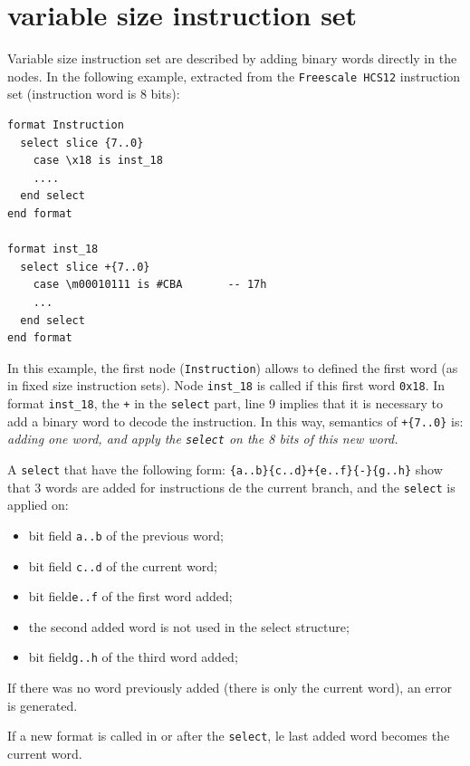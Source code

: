
\section{variable size instruction set}
\label{sec:formatTailleVariable}
Variable size instruction set are described by adding binary words directly in the nodes.
In the following example, extracted from the \texttt{Freescale HCS12} instruction set (instruction word is 8 bits):
\begin{lstlisting}
format Instruction 
  select slice {7..0}
    case \x18 is inst_18 
    ....
  end select
end format

format inst_18 
  select slice +{7..0}
    case \m00010111 is #CBA       -- 17h
    ...
  end select
end format
\end{lstlisting}
In this example, the first node (\texttt{Instruction}) allows to defined the first word (as in fixed size instruction sets). Node \texttt{inst\_18} is called if this first word \texttt{0x18}. In format \texttt{inst\_18}, the \texttt{+} in the \texttt{select} part, line 9 implies that it is necessary to add a binary word to decode the instruction.
In this way, semantics of \texttt{+\{7..0\}} is: \emph{adding one word, and apply the \texttt{select} on the 8 bits of this new word.}

A \texttt{select} that have the following form:  \texttt{\{a..b\}\{c..d\}+\{e..f\}\{-\}\{g..h\}} show that 3 words are added for instructions de the current branch, and the \texttt{select} is applied on:
\begin{itemize}
\item bit field \texttt{a..b} of the previous word;
\item bit field \texttt{c..d} of the current word;
\item bit field\texttt{e..f} of the first word added;
\item the second added word is not used in the select structure;
\item bit field\texttt{g..h} of the third word added;
\end{itemize}
If there was no word previously added (there is only the current word), an error is generated.

If a new format is called in or after the \texttt{select}, le last added word becomes the current word.

